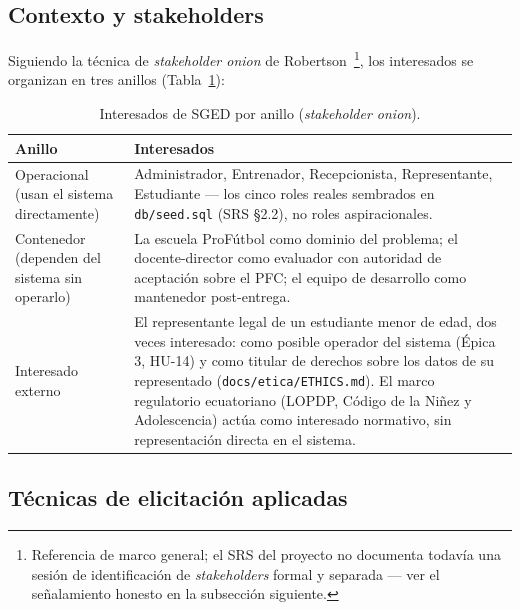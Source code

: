 \documentclass[11pt,a4paper]{article}
\newcommand{\ruta}[1]{\texttt{\footnotesize #1}}
\begin{document}
\subsection{Contexto y stakeholders}

Siguiendo la técnica de \emph{stakeholder onion} de
Robertson~\cite{iso29148}\footnote{Referencia de marco general; el SRS del
proyecto no documenta todavía una sesión de identificación de
\emph{stakeholders} formal y separada — ver el señalamiento honesto en la
subsección siguiente.}, los interesados se organizan en tres anillos
(Tabla~\ref{tab:stakeholders}):

\begin{table}[htbp]
\centering
\caption{Interesados de SGED por anillo (\emph{stakeholder onion}).}
\label{tab:stakeholders}
\begin{tabular}{@{}p{2.8cm}p{11.5cm}@{}}
\toprule
\textbf{Anillo} & \textbf{Interesados} \\
\midrule
Operacional (usan el sistema directamente) & Administrador, Entrenador,
Recepcionista, Representante, Estudiante — los cinco roles reales
sembrados en \texttt{db/seed.sql} (SRS \S2.2), no roles aspiracionales. \\
Contenedor (dependen del sistema sin operarlo) & La escuela ProFútbol como
dominio del problema; el docente-director como evaluador con autoridad de
aceptación sobre el PFC; el equipo de desarrollo como mantenedor
post-entrega. \\
Interesado externo & El representante legal de un estudiante menor de
edad, dos veces interesado: como posible operador del sistema (Épica 3,
HU-14) y como titular de derechos sobre los datos de su representado
(\ruta{docs/etica/ETHICS.md}). El marco regulatorio ecuatoriano (LOPDP,
Código de la Niñez y Adolescencia) actúa como interesado normativo, sin
representación directa en el sistema. \\
\bottomrule
\end{tabular}
\end{table}

\subsection{Técnicas de elicitación aplicadas}
\end{document}
